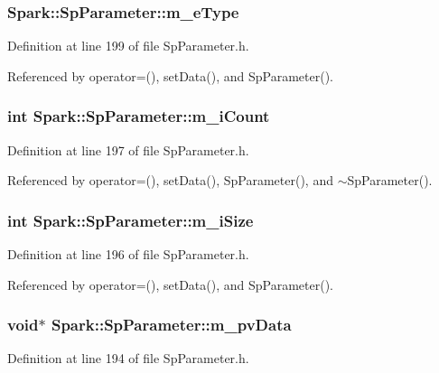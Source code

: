 \subsubsection{ {\bf Spark::Sp\-Parameter::m\_\-e\-Type}\hspace{0.3cm}{\tt  [protected]}}\label{classSpark_1_1SpParameter_p4}


Definition at line 199 of file Sp\-Parameter.h.

Referenced by operator=(), set\-Data(), and Sp\-Parameter().
\subsubsection{\setlength{\rightskip}{0pt plus 5cm}int {\bf Spark::Sp\-Parameter::m\_\-i\-Count}\hspace{0.3cm}{\tt  [protected]}}\label{classSpark_1_1SpParameter_p3}


Definition at line 197 of file Sp\-Parameter.h.

Referenced by operator=(), set\-Data(), Sp\-Parameter(), and $\sim$Sp\-Parameter().
\subsubsection{\setlength{\rightskip}{0pt plus 5cm}int {\bf Spark::Sp\-Parameter::m\_\-i\-Size}\hspace{0.3cm}{\tt  [protected]}}\label{classSpark_1_1SpParameter_p2}


Definition at line 196 of file Sp\-Parameter.h.

Referenced by operator=(), set\-Data(), and Sp\-Parameter().
\subsubsection{\setlength{\rightskip}{0pt plus 5cm}void$\ast$ {\bf Spark::Sp\-Parameter::m\_\-pv\-Data}\hspace{0.3cm}{\tt  [protected]}}\label{classSpark_1_1SpParameter_p1}


Definition at line 194 of file Sp\-Parameter.h.

